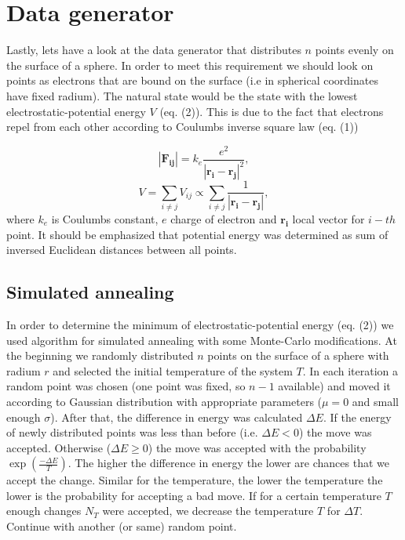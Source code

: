 \documentclass[a4paper, 12pt]{article}
\newcommand{\vect}[1]{\boldsymbol{#1}}
\begin{document}
\section{Data generator}
Lastly, lets have a look at the data generator that distributes $n$ points evenly on the surface of a sphere. In order to meet this requirement we should look on points as electrons that are bound on the surface (i.e in spherical coordinates have fixed radium). The natural state would be the state with the lowest electrostatic-potential energy $V$ (eq. (2)). This is due to the fact that electrons repel from each other according to Coulumbs inverse square law (eq. (1))

\begin{equation}
	|\vect{F_{ij}}| = k_e \frac{e^2}{|\vect{r_i}-\vect{r_j}|^2},
\end{equation}
\begin{equation}
	V = \sum_{i\neq j}V_{ij} \propto \sum_{i\neq j}\frac{1}{|\vect{r_i} - \vect{r_j}|},
\end{equation}
where $k_e$ is Coulumbs constant, $e$ charge of electron and $\vect{r_i}$ local vector for $i-th$ point. It should be emphasized that potential energy was determined as sum of inversed Euclidean distances between all points. 

\subsection{Simulated annealing}
In order to determine the minimum of electrostatic-potential energy (eq. (2)) we used algorithm for simulated annealing with some Monte-Carlo modifications. At the beginning we randomly distributed $n$ points on the surface of a sphere with radium $r$ and selected the initial temperature of the system $T$. In each iteration a random point was chosen (one point was fixed, so $n-1$ available) and moved it according to Gaussian distribution with appropriate parameters ($\mu = 0$ and small enough $\sigma$). After that, the difference in energy was calculated $\Delta E$. If the energy of newly distributed points was less than before (i.e. $\Delta E < 0$) the move was accepted. Otherwise ($\Delta E \geq 0$) the move was accepted with the probability $\exp(\frac{-\Delta E}{T})$. The higher the difference in energy the lower are chances that we accept the change. Similar for the temperature, the lower the temperature the lower is the probability for accepting a bad move. If for a certain temperature $T$ enough changes $N_T$ were accepted, we decrease the temperature $T$ for $\Delta T$. Continue with another (or same) random point.   
\end{document}
